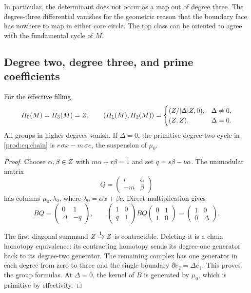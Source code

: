 In particular, the determinant does not occur as a map out of degree
three.  The degree-three differential vanishes for the geometric reason
that the boundary face has nowhere to map in either core circle.
The top class can be oriented to agree with the fundamental cycle of $M$.

\subsection{Degree two, degree three, and prime coefficients}

\begin{theorem}\label{prod:thm:homology3}
For the effective filling,
\[
 H_0(M)=H_3(M)=Z,\qquad
 (H_1(M),H_2(M))=
 \begin{cases}
 (Z/|\Delta|Z,0),&\Delta\ne0,\\
 (Z,Z),&\Delta=0.
 \end{cases}
\]
All groups in higher degrees vanish.
If $\Delta=0$, the primitive degree-two cycle in
\eqref{prod:eq:chain} is $r\,\sigma x-m\,\sigma c$, the suspension of $\mu_0$.
\end{theorem}

\begin{proof}
Choose $\alpha,\beta\in Z$ with $m\alpha+r\beta=1$ and set
$q=s\beta-\nu\alpha$.  The unimodular matrix
\[
 Q=\begin{pmatrix}r&\alpha\\-m&\beta\end{pmatrix}
\]
has columns $\mu_0,\lambda_0$, where $\lambda_0=\alpha x+\beta c$.
Direct multiplication gives
\begin{equation}\label{prod:eq:reduction}
 BQ=\begin{pmatrix}0&1\\\Delta&-q\end{pmatrix},\qquad
 \begin{pmatrix}1&0\\q&1\end{pmatrix}
 BQ\begin{pmatrix}0&1\\1&0\end{pmatrix}
        =\begin{pmatrix}1&0\\0&\Delta\end{pmatrix}.
\end{equation}

The first diagonal summand $Z\xrightarrow{1}Z$ is contractible.
Deleting it is a chain homotopy equivalence: its contracting homotopy
sends its degree-one generator back to its degree-two generator.
The remaining complex has one generator in each degree from zero to
three and the single boundary $\partial e_2=\Delta e_1$.
This proves the group formulas.  At $\Delta=0$, the kernel of $B$
is generated by $\mu_0$, which is primitive by effectivity.
\end{proof}

